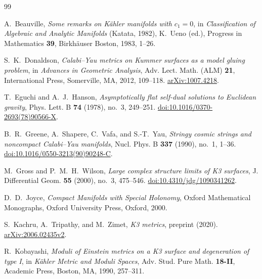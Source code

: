 \begin{thebibliography}{99}

A.~Beauville,
\emph{Some remarks on K\"ahler manifolds with \(c_1=0\)},
in \emph{Classification of Algebraic and Analytic Manifolds}
(Katata, 1982), K.~Ueno (ed.),
Progress in Mathematics \textbf{39}, Birkh\"auser Boston,
1983, 1--26.


S.~K.~Donaldson,
\emph{Calabi--Yau metrics on Kummer surfaces as a model gluing problem},
in \emph{Advances in Geometric Analysis},
Adv. Lect. Math. (ALM) \textbf{21}, International Press,
Somerville, MA, 2012, 109--118.
\href{https://arxiv.org/abs/1007.4218}{arXiv:1007.4218}.


T.~Eguchi and A.~J.~Hanson,
\emph{Asymptotically flat self-dual solutions to Euclidean gravity},
Phys. Lett. B \textbf{74} (1978), no.~3, 249--251.
\href{https://doi.org/10.1016/0370-2693(78)90566-X}{doi:10.1016/0370-2693(78)90566-X}.

B.~R.~Greene, A.~Shapere, C.~Vafa, and S.-T.~Yau,
\emph{Stringy cosmic strings and noncompact Calabi--Yau manifolds},
Nucl. Phys. B \textbf{337} (1990), no.~1, 1--36.
\href{https://doi.org/10.1016/0550-3213(90)90248-C}{doi:10.1016/0550-3213(90)90248-C}.


M.~Gross and P.~M.~H.~Wilson,
\emph{Large complex structure limits of K3 surfaces},
J. Differential Geom. \textbf{55} (2000), no.~3, 475--546.
\href{https://doi.org/10.4310/jdg/1090341262}{doi:10.4310/jdg/1090341262}.

D.~D.~Joyce,
\emph{Compact Manifolds with Special Holonomy},
Oxford Mathematical Monographs, Oxford University Press, Oxford, 2000.

S.~Kachru, A.~Tripathy, and M.~Zimet,
\emph{K3 metrics}, preprint (2020).
\href{https://arxiv.org/abs/2006.02435v2}{arXiv:2006.02435v2}.


R.~Kobayashi,
\emph{Moduli of Einstein metrics on a K3 surface and degeneration of type I},
in \emph{K\"ahler Metric and Moduli Spaces},
Adv. Stud. Pure Math. \textbf{18-II}, Academic Press, Boston, MA,
1990, 257--311.



\end{thebibliography}
